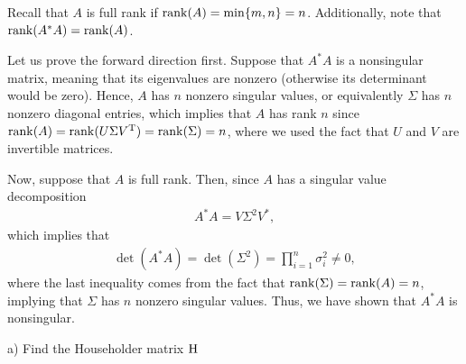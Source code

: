 \def\duedate{11/17/21}
\def\HWnum{3}



    

Recall that $A$ is full rank if $\rank(A) = \min\{m,n\} = n$.
Additionally, note that $\rank(A^{*}A) = \rank(A)$.

Let us prove the forward direction first.
Suppose that $A^{*}A$ is a nonsingular matrix, meaning that its eigenvalues are nonzero (otherwise its determinant would be zero).
Hence, $A$ has $n$ nonzero singular values, or equivalently $\Sigma$ has $n$ nonzero diagonal entries, which implies that $A$ has rank $n$ since $\rank(A) = \rank(U \Sigma V^{\rm T}) = \rank(\Sigma) = n$, where we used the fact that $U$ and $V$ are invertible matrices.

Now, suppose that $A$ is full rank.
Then, since $A$ has a singular value decomposition
\begin{eqnarray}
    \label{eq:A*A-SVD}
    A^{*}A = V \Sigma^2 V^{*} 
,\end{eqnarray}
which implies that 
\begin{eqnarray}
    \label{eq:determinant-A*A}
    \det(A^{*}A) = \det(\Sigma^2) = \prod_{i=1}^{n} \sigma_{i}^2 \ne 0
,\end{eqnarray}
where the last inequality comes from the fact that $\rank(\Sigma) = \rank(A) = n$, implying that $\Sigma$ has $n$ nonzero singular values.
Thus, we have shown that $A^{*}A$ is nonsingular.



a) Find the Householder matrix $\rm H$

